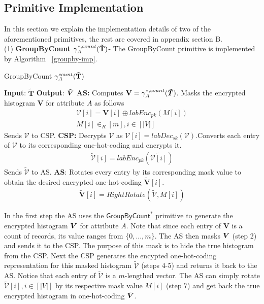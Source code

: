 \subsection{Primitive Implementation}
In this section we explain the implementation details of two of the aforementioned \system primitives, the rest are covered in appendix section B.\\ (1)\textbf{ \textsf{GroupByCount }}$\gamma^{*,count}_A(\mathbf{\tilde{T}})$- The \textsf{GroupByCount} primitive is implemented by Algorithm ~\ref{groupby-imp}. \begin{algorithm}
\small
\caption{\textsf{GroupByCount }$\gamma^{count}_A(\mathbf{\tilde{T}})$}
\begin{algorithmic}[1]
\STATEx
\textbf{Input}: $\mathbf{\tilde{T}}$
\STATEx \textbf{Output}: $\tilde{\boldsymbol{V}}$
\STATEx \textbf{\textsf{AS}:} \STATE Computes $\mathbf{V}=\gamma^{*,count}_{A}(\boldsymbol{\tilde{T}})$.
\STATE Masks the encrypted histogram $\mathbf{V}$ for attribute $A$ as follows \begin{gather*}\boldsymbol{\mathcal{V}}[i]= \mathbf{V}[i] \oplus labEnc_{pk}(M[i])\\M[i] \in_R [m], i \in [|V|]\end{gather*}
\STATE Sends $\boldsymbol{\mathcal{V}}$ to \textsf{CSP}.
\STATEx \textbf{\textsf{CSP}:}
\STATE Decrypts  $\boldsymbol{\mathcal{V}}$ as $\mathcal{V}[i]=labDec_{sk}(\boldsymbol{\mathcal{V}})$.\STATE Converts each entry of $\mathcal{V}$ to its corresponding one-hot-coding and encrypts it. \begin{gather*}\boldsymbol{\tilde{\mathcal{V}}}[i]=labEnc_{pk}(\tilde{\mathcal{V}[i]})\end{gather*} 
\STATE Sends $\boldsymbol{\tilde{\mathcal{V}}}$ to \textsf{AS}.
\STATEx \textbf{\textsf{AS}}:
\STATE  Rotates every entry by its corresponding mask value to obtain the desired  encrypted one-hot-coding $\boldsymbol{\tilde{V}}[i]$. \begin{gather*}\boldsymbol{\tilde{V}}[i]=RightRotate(\boldsymbol{\tilde{\mathcal{V}}},M[i])\end{gather*} 
 \end{algorithmic} \label{groupby-imp}
\end{algorithm} 
In the first step the \textsf{AS} uses the $\textsf{GroupByCount}^*$ primitive to generate the encrypted histogram $\boldsymbol{V}$ for attribute $A$. Note that since each entry of $\mathbf{V}$ is a count of records, its value ranges from $\{0,...,m\}$. The \textsf{AS} then masks $\boldsymbol{V}$ (step 2) and sends it to the \textsf{CSP}. The purpose of this mask is to hide the true histogram from the \textsf{CSP}. Next the \textsf{CSP} generates the encypted one-hot-coding representation for this masked histogram $\boldsymbol{\tilde{\mathcal{V}}}$ (steps 4-5) and returns it back to the \textsf{AS}. Notice that each entry of $\boldsymbol{\tilde{\mathcal{V}}}$ is a $m$-lengthed vector. The \textsf{AS} can simply rotate $\boldsymbol{\tilde{\mathcal{V}}}[i], i \in [|V|]$ by its respective mask value $M[i]$ (step 7) and get back the true encrypted histogram in one-hot-coding $\tilde{\boldsymbol{V}}$.
